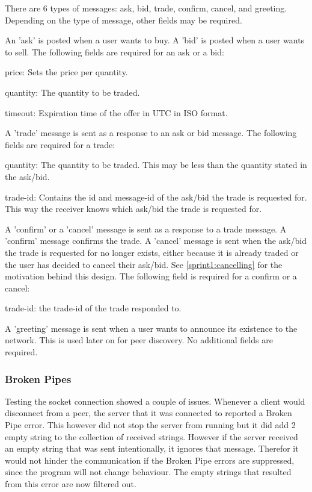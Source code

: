 There are 6 types of messages: ask, bid, trade, confirm, cancel, and greeting.
Depending on the type of message, other fields may be required.

An 'ask' is posted when a user wants to buy.
A 'bid' is posted when a user wants to sell.
The following fields are required for an ask or a bid:
\begin{myitemize}
	\item price: Sets the price per quantity.
	\item quantity: The quantity to be traded.
	\item timeout: Expiration time of the offer in UTC in ISO format.
\end{myitemize}

A 'trade' message is sent as a response to an ask or bid message.
The following fields are required for a trade:
\begin{myitemize}
	\item quantity: The quantity to be traded. This may be less than the quantity stated in the ask/bid.
	\item trade-id: Contains the id and message-id of the ask/bid the trade is requested for. This way the receiver knows which ask/bid the trade is requested for.
\end{myitemize}

A 'confirm' or a 'cancel' message is sent as a response to a trade message.
A 'confirm' message confirms the trade.
A 'cancel' message is sent when the ask/bid the trade is requested for no longer exists, either because it is already traded or the user has decided to cancel their ask/bid.
See \ref{sprint1:cancelling} for the motivation behind this design.
The following field is required for a confirm or a cancel:
\begin{myitemize}
\item trade-id: the trade-id of the trade responded to.
\end{myitemize}

A 'greeting' message is sent when a user wants to announce its existence to the network.
This is used later on for peer discovery.
No additional fields are required.

\subsubsection{Broken Pipes}
Testing the socket connection showed a couple of issues.
Whenever a client would disconnect from a peer, the server that it was connected to reported a Broken Pipe error.
This however did not stop the server from running but it did add 2 empty string to the collection of received strings.
However if the server received an empty string that was sent intentionally, it ignores that message.
Therefor it would not hinder the communication if the Broken Pipe errors are suppressed, since the program will not change behaviour.
The empty strings that resulted from this error are now filtered out.

